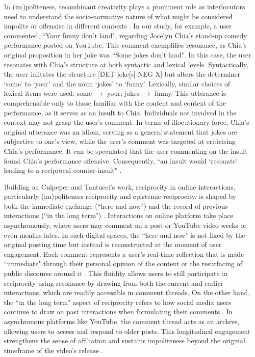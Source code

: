 \documentclass[english]{textolivre}
\begin{document}
In (im)politeness, recombinant creativity plays a prominent role as interlocutors need to understand the socio-normative nature of what might be considered impolite or offensive in different contexts \cite{tantucci2023}. In our study, for example, a user commented, ``Your funny don’t land", regarding Jocelyn Chia’s stand-up comedy performance posted on YouTube. This comment exemplifies resonance, as Chia’s original proposition in her joke was ``Some jokes don’t land". In this case, the user resonates with Chia’s structure at both syntactic and lexical levels. Syntactically, the user imitates the structure [DET joke[s] NEG X] but alters the determiner ‘some’ to ‘your’ and the noun ‘jokes’ to ‘funny’. Lexically, similar choices of lexical items were used: some $\rightarrow$ your; jokes $\rightarrow$ funny. This utterance is comprehensible only to those familiar with the content and context of the performance, as it serves as an insult to Chia. Individuals not involved in the context may not grasp the user’s comment. In terms of illocutionary force, Chia’s original utterance was an idiom, serving as a general statement that jokes are subjective to one’s view, while the user’s comment was targeted at criticising Chia’s performance. It can be speculated that the user commenting on the insult found Chia’s performance offensive. Consequently, ``an insult would ‘resonate’ leading to a reciprocal counter-insult" \cite[p. 10]{tantucci2018}.

Building on Culpeper and Tantucci’s \citeyear{culpeper2021} work, reciprocity in online interactions, particularly (im)politeness reciprocity and epistemic reciprocity, is shaped by both the immediate exchange (``here and now") and the record of previous interactions (``in the long term") \cite{oliveira2025}. Interactions on online platform take place asynchronously, where users may comment on a post or YouTube video weeks or even months later. In such digital spaces, the ``here and now" is not fixed by the original posting time but instead is reconstructed at the moment of user engagement. Each comment represents a user’s real-time reflection that is made ``immediate" through their personal opinion of the content or the resurfacing of public discourse around it \cite{oliveira2025}. This fluidity allows users to still participate in reciprocity using resonance by drawing from both the current and earlier interactions, which are readily accessible in comment threads. On the other hand, the ``in the long term" aspect of reciprocity refers to how social media users continue to draw on past interactions when formulating their comments \cite{oliveira2025}. In asynchronous platforms like YouTube, the comment thread acts as an archive, allowing users to access and respond to older posts. This longitudinal engagement strengthens the sense of affiliation and sustains impoliteness beyond the original timeframe of the video’s release \cite{oliveira2025}.
\end{document}
